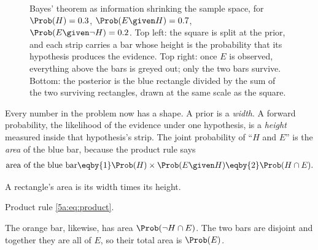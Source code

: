 \begin{figure}[htbp]
\caption{Bayes' theorem as information shrinking the sample space, for
$\Prob(H)=0.3$, $\Prob(E\given H)=0.7$, $\Prob(E\given\neg H)=0.2$. Top left: the
square is split at the prior, and each strip carries a bar whose height is the
probability that its hypothesis produces the evidence. Top right: once $E$ is
observed, everything above the bars is greyed out; only the two bars survive.
Bottom: the posterior is the blue rectangle divided by the sum of the two
surviving rectangles, drawn at the same scale as the square.}
\label{5a:fig:square}
\end{figure}

Every number in the problem now has a shape. A prior is a \emph{width}. A forward
probability, the likelihood of the evidence under one hypothesis, is a
\emph{height} measured inside that hypothesis's strip. The joint probability of
``$H$ and $E$'' is the \emph{area} of the blue bar, because the product rule says
\begin{align}
  \text{area of the blue bar}
  \eqby{1}\Prob(H)\times\Prob(E\given H)
  \eqby{2}\Prob(H\cap E) .
  \label{5a:eq:area}
\end{align}
\begin{explain}
  \item A rectangle's area is its width times its height.
  \item Product rule \eqref{5a:eq:product}.
\end{explain}
The orange bar, likewise, has area $\Prob(\neg H\cap E)$. The two bars are
disjoint and together they are all of $E$, so their total area is $\Prob(E)$.


